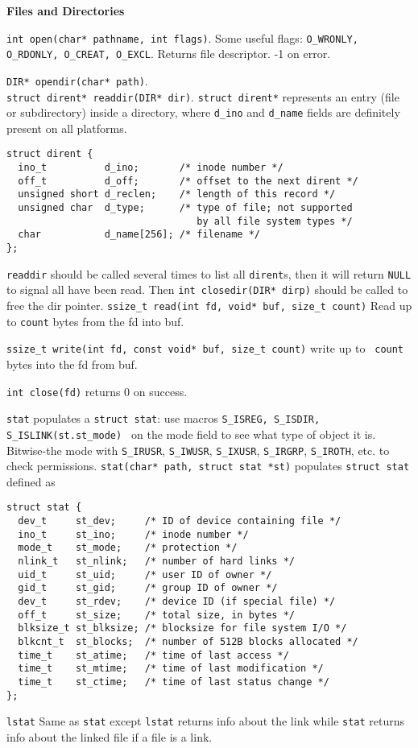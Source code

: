 \documentclass{article}
\begin{document}
\small
\begin{multicols}{2}
  \raggedright
  {\bf Files and Directories}

  {\tt int open(char* pathname, int flags)}. Some useful flags:
  {\tt O\_WRONLY, O\_RDONLY, O\_CREAT, O\_EXCL}. Returns file descriptor. -1 on
  error.

  {\tt DIR* opendir(char* path)}.\\
  {\tt struct dirent* readdir(DIR* dir)}. \texttt{struct dirent*} represents an
  entry (file or subdirectory) inside a directory, where \texttt{d\_ino} and
  \texttt{d\_name} fields are definitely present on all platforms.
  {\footnotesize
  \begin{verbatim}
struct dirent {
  ino_t          d_ino;       /* inode number */
  off_t          d_off;       /* offset to the next dirent */
  unsigned short d_reclen;    /* length of this record */
  unsigned char  d_type;      /* type of file; not supported
                                 by all file system types */
  char           d_name[256]; /* filename */
};\end{verbatim}}
  \texttt{readdir} should be called several times to list all \texttt{dirent}s,
  then it will return \texttt{NULL} to signal all have been read. Then
  \texttt{int closedir(DIR* dirp)} should be called to free the dir pointer.
  {\tt ssize\_t read(int fd, void* buf, size\_t count)} Read up to {\tt count}
  bytes from the fd into buf.

  {\tt ssize\_t write(int fd, const void* buf, size\_t count)} write up to {\tt
  count} bytes into the fd from buf.

  {\tt int close(fd)} returns 0 on success.

  {\tt stat} populates a {\tt struct stat}: use macros
  {\tt S\_ISREG, S\_ISDIR, S\_ISLINK(st.st\_mode) } on the mode field to see
  what type of object it is. Bitwise-the mode with \texttt{S\_IRUSR},
  \texttt{S\_IWUSR}, \texttt{S\_IXUSR}, \texttt{S\_IRGRP}, \texttt{S\_IROTH},
  etc. to check permissions.
  {\tt stat(char* path, struct stat *st)} populates \texttt{struct stat} defined
  as
  {\footnotesize
  \begin{verbatim}
struct stat {
  dev_t     st_dev;     /* ID of device containing file */
  ino_t     st_ino;     /* inode number */
  mode_t    st_mode;    /* protection */
  nlink_t   st_nlink;   /* number of hard links */
  uid_t     st_uid;     /* user ID of owner */
  gid_t     st_gid;     /* group ID of owner */
  dev_t     st_rdev;    /* device ID (if special file) */
  off_t     st_size;    /* total size, in bytes */
  blksize_t st_blksize; /* blocksize for file system I/O */
  blkcnt_t  st_blocks;  /* number of 512B blocks allocated */
  time_t    st_atime;   /* time of last access */
  time_t    st_mtime;   /* time of last modification */
  time_t    st_ctime;   /* time of last status change */
}; \end{verbatim}}
  {\tt lstat} Same as {\tt stat} except {\tt lstat} returns info about the
  link while {\tt stat} returns info about the linked file if a file is a link.


\end{multicols}
\end{document}
